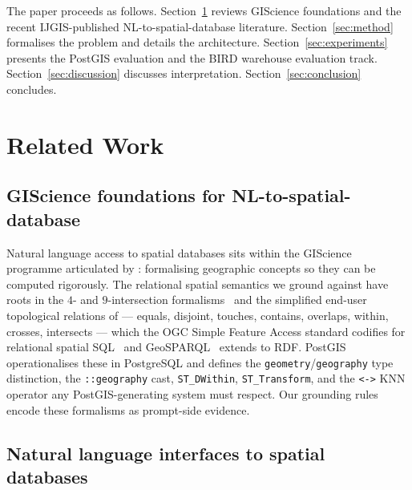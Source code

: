 \documentclass[11pt]{article}
\begin{document}
The paper proceeds as follows. Section~\ref{sec:related} reviews GIScience foundations and the recent IJGIS-published NL-to-spatial-database literature. Section~\ref{sec:method} formalises the problem and details the architecture. Section~\ref{sec:experiments} presents the PostGIS evaluation and the BIRD warehouse evaluation track. Section~\ref{sec:discussion} discusses interpretation. Section~\ref{sec:conclusion} concludes.

\section{Related Work}
\label{sec:related}

\subsection{GIScience foundations for NL-to-spatial-database}

Natural language access to spatial databases sits within the GIScience programme articulated by \citet{goodchild1992gis}: formalising geographic concepts so they can be computed rigorously. The relational spatial semantics we ground against have roots in the $4$- and $9$-intersection formalisms~\citep{egenhofer1991topological} and the simplified end-user topological relations of \citet{clementini1993small} --- equals, disjoint, touches, contains, overlaps, within, crosses, intersects --- which the OGC Simple Feature Access standard codifies for relational spatial SQL~\citep{ogcsfs} and GeoSPARQL~\citep{ogcgeosparql} extends to RDF. PostGIS~\citep{postgis} operationalises these in PostgreSQL and defines the \texttt{geometry}/\texttt{geography} type distinction, the \texttt{::geography} cast, \texttt{ST\_DWithin}, \texttt{ST\_Transform}, and the \texttt{<->} KNN operator any PostGIS-generating system must respect. Our grounding rules encode these formalisms as prompt-side evidence.

\subsection{Natural language interfaces to spatial databases}
\end{document}

